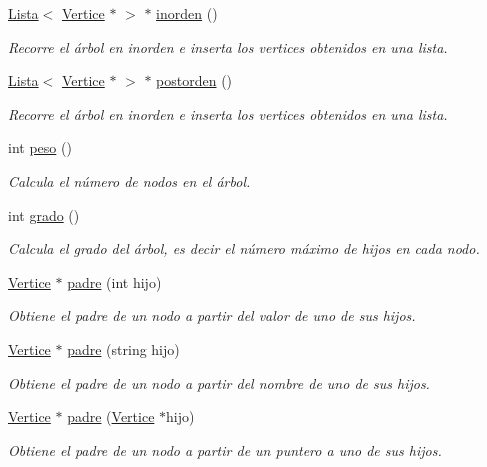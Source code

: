 \begin{DoxyCompactItemize}
\hyperlink{classLista}{Lista}$<$ \hyperlink{classVertice}{Vertice} $\ast$ $>$ $\ast$ \hyperlink{classArbol_a80a0c3cf2d7f3e92a5c8e5504947dab5}{inorden} ()
\begin{DoxyCompactList}\small\item\em Recorre el árbol en inorden e inserta los vertices obtenidos en una lista. \end{DoxyCompactList}\item 
\hyperlink{classLista}{Lista}$<$ \hyperlink{classVertice}{Vertice} $\ast$ $>$ $\ast$ \hyperlink{classArbol_a126e7d801dbe214ac39f183c26e9135d}{postorden} ()
\begin{DoxyCompactList}\small\item\em Recorre el árbol en inorden e inserta los vertices obtenidos en una lista. \end{DoxyCompactList}\item 
int \hyperlink{classArbol_a9051a6b4120b42ff8d046f41ab73dbaa}{peso} ()
\begin{DoxyCompactList}\small\item\em Calcula el número de nodos en el árbol. \end{DoxyCompactList}\item 
int \hyperlink{classArbol_a99e608849650b891c34852a81f93d4ab}{grado} ()
\begin{DoxyCompactList}\small\item\em Calcula el grado del árbol, es decir el número máximo de hijos en cada nodo. \end{DoxyCompactList}\item 
\hyperlink{classVertice}{Vertice} $\ast$ \hyperlink{classArbol_abcb8c26e9021a1418de71ad6014351cf}{padre} (int hijo)
\begin{DoxyCompactList}\small\item\em Obtiene el padre de un nodo a partir del valor de uno de sus hijos. \end{DoxyCompactList}\item 
\hyperlink{classVertice}{Vertice} $\ast$ \hyperlink{classArbol_a53527e7a8999ceda0b8a0fa25a3f357c}{padre} (string hijo)
\begin{DoxyCompactList}\small\item\em Obtiene el padre de un nodo a partir del nombre de uno de sus hijos. \end{DoxyCompactList}\item 
\hyperlink{classVertice}{Vertice} $\ast$ \hyperlink{classArbol_a3395234bc7b7a91d2880e10367039284}{padre} (\hyperlink{classVertice}{Vertice} $\ast$hijo)
\begin{DoxyCompactList}\small\item\em Obtiene el padre de un nodo a partir de un puntero a uno de sus hijos. \end{DoxyCompactList}\item 

\end{DoxyCompactItemize}
